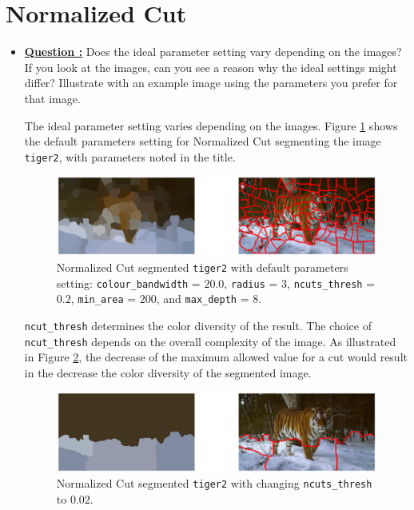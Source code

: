 \documentclass[11pt,a4paper]{article}
\begin{document}
\section{Normalized Cut}
\begin{itemize}
	\item\addtocounter{Counter}{1}\underline{\textbf{Question :}} Does the ideal parameter setting vary depending on the images? If you look at the images, can you see a reason why the ideal settings might differ? Illustrate with an example image using the parameters you prefer for that image.
		\par The ideal parameter setting varies depending on the images. Figure \ref{fig:Normalizedcut_Tiger2_Default} shows the default parameters setting for Normalized Cut segmenting the image \texttt{tiger2}, with parameters noted in the title.

		\begin{figure}[!ht]
			\centering
			\includegraphics[width=\columnwidth]{Figure/Normalizedcut_Tiger2_Default.eps}
			\caption{Normalized Cut segmented \texttt{tiger2} with default parameters setting: \texttt{colour\_bandwidth} = $20.0$, \texttt{radius} = $3$, \texttt{ncuts\_thresh} = $0.2$, \texttt{min\_area} = $200$, and \texttt{max\_depth} = $8$.}
			\label{fig:Normalizedcut_Tiger2_Default}
		\end{figure}

		\par \texttt{ncut\_thresh} determines the color diversity of the result. The choice of \texttt{ncut\_thresh} depends on the overall complexity of the image. As illustrated in Figure \ref{fig:Normalizedcut_Tiger2_nCutsthresh_0_02}, the decrease of the maximum allowed value for a cut would result in the decrease the color diversity of the segmented image.

		\begin{figure}[!ht]
			\centering
			\includegraphics[width=\columnwidth]{Figure/Normalizedcut_Tiger2_nCutsthresh_0_02.eps}
			\caption{Normalized Cut segmented \texttt{tiger2} with changing \texttt{ncuts\_thresh} to $0.02$.}
			\label{fig:Normalizedcut_Tiger2_nCutsthresh_0_02}
		\end{figure}


\end{itemize}
\end{document}
